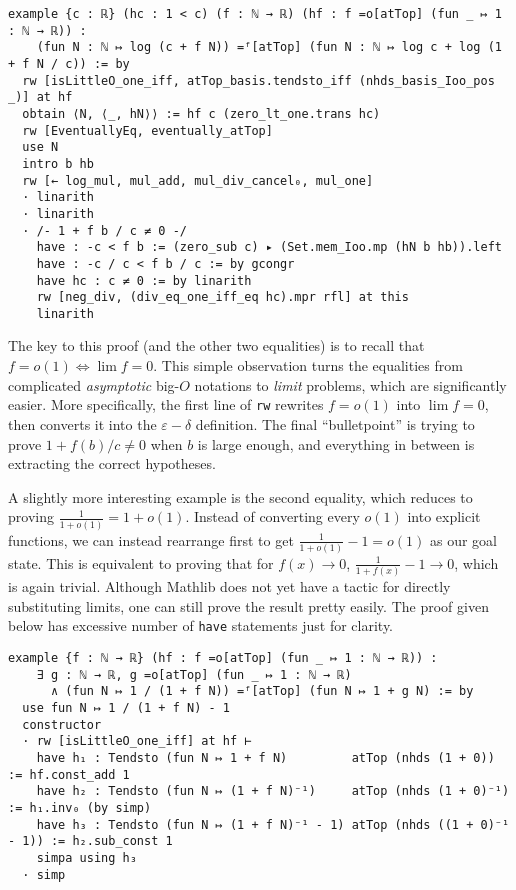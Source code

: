 \begin{verbatim}
example {c : ℝ} (hc : 1 < c) (f : ℕ → ℝ) (hf : f =o[atTop] (fun _ ↦ 1 : ℕ → ℝ)) :
    (fun N : ℕ ↦ log (c + f N)) =ᶠ[atTop] (fun N : ℕ ↦ log c + log (1 + f N / c)) := by
  rw [isLittleO_one_iff, atTop_basis.tendsto_iff (nhds_basis_Ioo_pos _)] at hf
  obtain ⟨N, ⟨_, hN⟩⟩ := hf c (zero_lt_one.trans hc)
  rw [EventuallyEq, eventually_atTop]
  use N
  intro b hb
  rw [← log_mul, mul_add, mul_div_cancel₀, mul_one]
  · linarith
  · linarith
  · /- 1 + f b / c ≠ 0 -/
    have : -c < f b := (zero_sub c) ▸ (Set.mem_Ioo.mp (hN b hb)).left
    have : -c / c < f b / c := by gcongr
    have hc : c ≠ 0 := by linarith
    rw [neg_div, (div_eq_one_iff_eq hc).mpr rfl] at this
    linarith
\end{verbatim}

The key to this proof (and the other two equalities) is to recall that \(f = o(1) \iff \lim f = 0\). This simple observation turns the equalities from complicated \textit{asymptotic} big-\(O\) notations to \textit{limit} problems, which are significantly easier. More specifically, the first line of \texttt{rw} rewrites \(f = o(1)\) into \(\lim f = 0\), then converts it into the \(\varepsilon-\delta\) definition. The final ``bulletpoint'' is trying to prove \(1 + f(b) / c \neq 0\) when \(b\) is large enough, and everything in between is extracting the correct hypotheses.

A slightly more interesting example is the second equality, which reduces to proving \(\frac{1}{1 + o(1)} = 1 + o(1)\). Instead of converting every \(o(1)\) into explicit functions, we can instead rearrange first to get \(\frac{1}{1 + o(1)} - 1 = o(1)\) as our goal state. This is equivalent to proving that for \(f(x) \to 0\), \(\frac{1}{1 + f(x)} - 1 \to 0\), which is again trivial. Although Mathlib does not yet have a tactic for directly substituting limits, one can still prove the result pretty easily. The proof given below has excessive number of \texttt{have} statements just for clarity.

\begin{verbatim}
example {f : ℕ → ℝ} (hf : f =o[atTop] (fun _ ↦ 1 : ℕ → ℝ)) :
    ∃ g : ℕ → ℝ, g =o[atTop] (fun _ ↦ 1 : ℕ → ℝ)
      ∧ (fun N ↦ 1 / (1 + f N)) =ᶠ[atTop] (fun N ↦ 1 + g N) := by
  use fun N ↦ 1 / (1 + f N) - 1
  constructor
  · rw [isLittleO_one_iff] at hf ⊢
    have h₁ : Tendsto (fun N ↦ 1 + f N)         atTop (nhds (1 + 0))         := hf.const_add 1
    have h₂ : Tendsto (fun N ↦ (1 + f N)⁻¹)     atTop (nhds (1 + 0)⁻¹)       := h₁.inv₀ (by simp)
    have h₃ : Tendsto (fun N ↦ (1 + f N)⁻¹ - 1) atTop (nhds ((1 + 0)⁻¹ - 1)) := h₂.sub_const 1
    simpa using h₃
  · simp
\end{verbatim}
